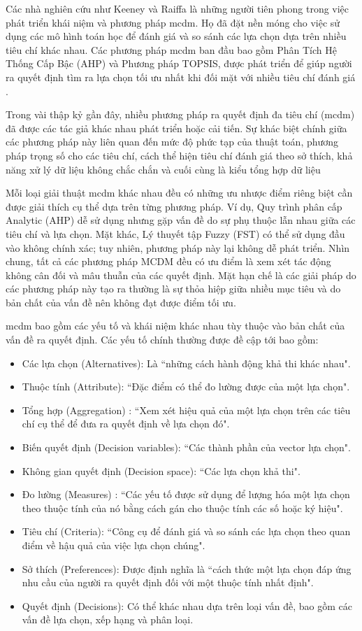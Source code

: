 Các nhà nghiên cứu như Keeney và Raiffa là những người tiên phong trong việc phát triển khái niệm và phương pháp \acrshort{mcdm}. Họ đã đặt nền móng cho việc sử dụng các mô hình toán học để đánh giá và so sánh các lựa chọn dựa trên nhiều tiêu chí khác nhau. Các phương pháp \acrshort{mcdm} ban đầu bao gồm Phân Tích Hệ Thống Cấp Bậc (AHP) và Phương pháp TOPSIS, được phát triển để giúp người ra quyết định tìm ra lựa chọn tối ưu nhất khi đối mặt với nhiều tiêu chí đánh giá \cite{thutucphapluat}. 

Trong vài thập kỷ gần đây, nhiều phương pháp ra quyết định đa tiêu chí (\acrshort{mcdm}) đã được các tác giả khác nhau phát triển hoặc cải tiến. Sự khác biệt chính giữa các phương pháp này liên quan đến mức độ phức tạp của thuật toán, phương pháp trọng số cho các tiêu chí, cách thể hiện tiêu chí đánh giá theo sở thích, khả năng xử lý dữ liệu không chắc chắn và cuối cùng là kiểu tổng hợp dữ liệu 

Mỗi loại giải thuật \acrshort{mcdm} khác nhau đều có những ưu nhược điểm riêng biệt cần được giải thích cụ thể dựa trên từng phương pháp. Ví dụ, Quy trình phân cấp Analytic (AHP) dễ sử dụng nhưng gặp vấn đề do sự phụ thuộc lẫn nhau giữa các tiêu chí và lựa chọn. Mặt khác, Lý thuyết tập Fuzzy (FST) có thể sử dụng đầu vào không chính xác; tuy nhiên, phương pháp này lại không dễ phát triển. Nhìn chung, tất cả các phương pháp MCDM đều có ưu điểm là xem xét tác động không cân đối và mâu thuẫn của các quyết định. Mặt hạn chế là các giải pháp do các phương pháp này tạo ra thường là sự thỏa hiệp giữa nhiều mục tiêu và do bản chất của vấn đề nên không đạt được điểm tối ưu. 

\acrshort{mcdm} bao gồm các yếu tố và khái niệm khác nhau tùy thuộc vào bản chất của vấn đề ra quyết định. Các yếu tố chính thường được đề cập tới bao gồm:
\begin{itemize}
    \item Các lựa chọn (Alternatives): Là ``những cách hành động khả thi khác nhau".
    \item Thuộc tính (Attribute): ``Đặc điểm có thể đo lường được của một lựa chọn".
    \item Tổng hợp (Aggregation) : ``Xem xét hiệu quả của một lựa chọn trên các tiêu chí cụ thể để đưa ra quyết định về lựa chọn đó".
    \item Biến quyết định (Decision variables): ``Các thành phần của vector lựa chọn".
    \item Không gian quyết định (Decision space): ``Các lựa chọn khả thi".
    \item Đo lường (Measures) : ``Các yếu tố được sử dụng để lượng hóa một lựa chọn theo thuộc tính của nó bằng cách gán cho thuộc tính các số hoặc ký hiệu".
    \item Tiêu chí (Criteria): ``Công cụ để đánh giá và so sánh các lựa chọn theo quan điểm về hậu quả của việc lựa chọn chúng".
    \item Sở thích (Preferences): Được định nghĩa là ``cách thức một lựa chọn đáp ứng nhu cầu của người ra quyết định đối với một thuộc tính nhất định".
    \item Quyết định (Decisions): Có thể khác nhau dựa trên loại vấn đề, bao gồm các vấn đề lựa chọn, xếp hạng và phân loại.
\end{itemize}

